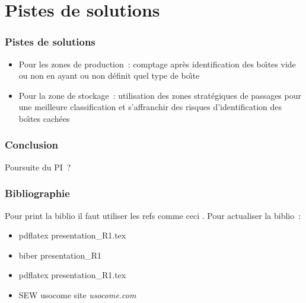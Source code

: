 \documentclass[aspectratio = 43]{beamer}
\begin{document}
\section{Pistes de solutions}
\begin{frame}
  \frametitle{Pistes de solutions}
  \begin{itemize}
  \item Pour les zones de production~: comptage apr{\`e}s identification
    des bo{\^\i}tes vide ou non en ayant ou non d{\'e}finit quel type de bo{\^\i}te
  \item Pour la zone de stockage~: utilisation des zones strat{\'e}giques
    de passages pour une meilleure classification et s'affranchir des
    risques d'identification des bo{\^\i}tes cach{\'e}es
  \end{itemize}
\end{frame}
%
\begin{frame}
  \frametitle{Conclusion}
  Poursuite du PI~?
\end{frame}
\begin{frame}
  \frametitle{Bibliographie}
  Pour print la biblio il faut utiliser les refs comme ceci
  \citeauthor{bib:ziou}. Pour actualiser la biblio~:
  \begin{itemize}
  \item pdflatex presentation\_R1.tex
  \item biber presentation\_R1
  \item pdflatex presentation\_R1.tex
  \end{itemize}

  \printbibliography%

  \begin{itemize}
  \item SEW usocome site \textit{usocome.com}
  \end{itemize}
\end{frame}
\end{document}

